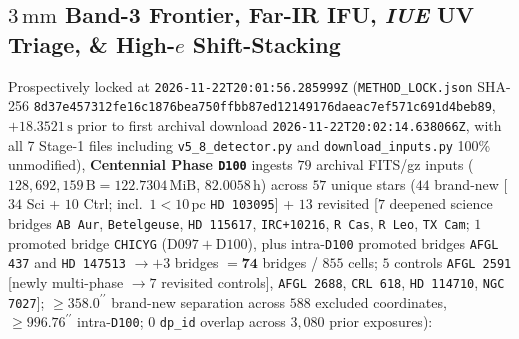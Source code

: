 \documentclass[twocolumn,10pt]{article}
\begin{document}
\subsection{$3\,\mathrm{mm}$ Band-3 Frontier, Far-IR IFU, \textit{IUE} UV Triage, \& High-$e$ Shift-Stacking}
Prospectively locked at \texttt{2026-11-22T20:01:56.285999Z} (\texttt{METHOD\_LOCK.json} SHA-256 \texttt{8d37e457\allowbreak 312fe16c\allowbreak 1876bea7\allowbreak 50ffbb87\allowbreak ed121491\allowbreak 76daeac7\allowbreak ef571c69\allowbreak 1d4beb89}, $+18.3521\,\text{s}$ prior to first archival download \texttt{2026-11-22T20:02:14.638066Z}, with all 7 Stage-1 files including \texttt{v5\_8\_detector.py} and \texttt{download\_inputs.py} 100\% unmodified), \textbf{Centennial Phase \texttt{D100}} ingests $79$ archival FITS/gz inputs ($128{,}692{,}159\,\text{B} = 122.7304\,\text{MiB}$, $82.0058\,\text{h}$) across $57$ unique stars ($44$ brand-new [$34$ Sci + $10$ Ctrl; incl.\ $1 < 10\,\text{pc}$ \texttt{HD\,103095}] + $13$ revisited [$7$ deepened science bridges \texttt{AB\,Aur}, \texttt{Betelgeuse}, \texttt{HD\,115617}, \texttt{IRC+10216}, \texttt{R\,Cas}, \texttt{R\,Leo}, \texttt{TX\,Cam}; $1$ promoted bridge \texttt{CHICYG} ($\mathrm{D097+D100}$), plus intra-\texttt{D100} promoted bridges \texttt{AFGL\,437} and \texttt{HD\,147513} $\rightarrow +3$ bridges $= \mathbf{74}$ bridges / $855$ cells; $5$ controls \texttt{AFGL\,2591} [newly multi-phase $\rightarrow 7$ revisited controls], \texttt{AFGL\,2688}, \texttt{CRL\,618}, \texttt{HD\,114710}, \texttt{NGC\,7027}]; $\ge 358.0^{\prime\prime}$ brand-new separation across $588$ excluded coordinates, $\ge 996.76^{\prime\prime}$ intra-\texttt{D100}; $0$ \texttt{dp\_id} overlap across $3{,}080$ prior exposures):
\end{document}
